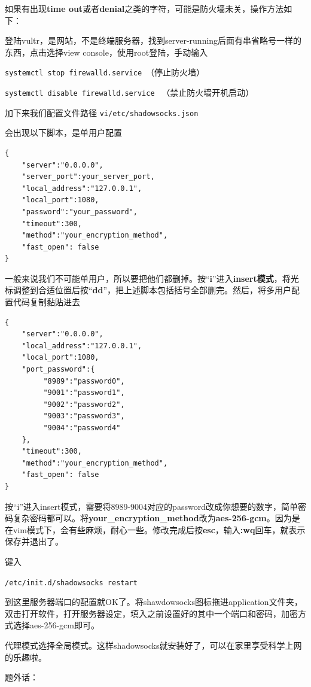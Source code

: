 \documentclass[]{ctexbook}
\begin{document}
如果有出现\textbf{time out}或者\textbf{denial}之类的字符，可能是防火墙未关，操作方法如下：

登陆vultr，是网站，不是终端服务器，找到server-running后面有串省略号一样的东西，点击选择view console，使用root登陆，手动输入

\texttt{systemctl\ stop\ firewalld.service}~（停止防火墙）

\texttt{systemctl\ disable\ firewalld.service}~ （禁止防火墙开机启动）

加下来我们配置文件路径
\texttt{vi/etc/shadowsocks.json}

会出现以下脚本，是单用户配置

\begin{verbatim}
{
    "server":"0.0.0.0",
    "server_port":your_server_port,
    "local_address":"127.0.0.1",
    "local_port":1080,
    "password":"your_password",
    "timeout":300,
    "method":"your_encryption_method",
    "fast_open": false
}
\end{verbatim}

一般来说我们不可能单用户，所以要把他们都删掉。按``\textbf{i}''进入\textbf{insert模式}，将光标调整到合适位置后按``\textbf{dd}''，把上述脚本包括括号全部删完。然后，将多用户配置代码复制黏贴进去

\begin{verbatim}
{
    "server":"0.0.0.0",
    "local_address":"127.0.0.1",
    "local_port":1080,
    "port_password":{
         "8989":"password0",
         "9001":"password1",
         "9002":"password2",
         "9003":"password3",
         "9004":"password4"
    },
    "timeout":300,
    "method":"your_encryption_method",
    "fast_open": false
}
\end{verbatim}

按``i''进入insert模式，需要将8989-9004对应的password改成你想要的数字，简单密码复杂密码都可以。将\textbf{your\_encryption\_method}改为\textbf{aes-256-gcm}。因为是在vim模式下，会有些麻烦，耐心一些。修改完成后按\textbf{esc}，输入\textbf{:wq}回车，就表示保存并退出了。

键入

\texttt{/etc/init.d/shadowsocks\ restart}

到这里服务器端口的配置就OK了。将shawdowsocks图标拖进application文件夹，双击打开软件，打开服务器设定，填入之前设置好的其中一个端口和密码，加密方式选择aes-256-gcm即可。

代理模式选择全局模式。这样shadowsocks就安装好了，可以在家里享受科学上网的乐趣啦。

题外话：
\end{document}
